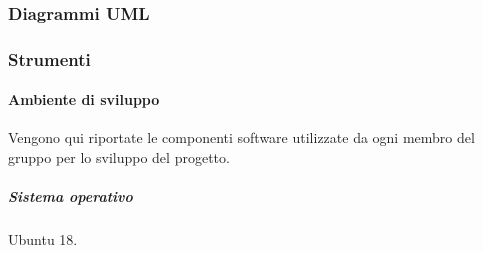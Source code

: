         




		\subsubsection{Diagrammi UML}\label{PP:Sviluppo:UML}	
		
		

        
        \subsubsection{Strumenti}\label{PP:Sviluppo:Strumenti}
        
	    \paragraph{Ambiente di sviluppo}\label{PP:Sviluppo:Strumenti:AmbienteSviluppo}
	    Vengono qui riportate le componenti software utilizzate da ogni membro del gruppo per lo sviluppo del progetto.
	         	
	        	
	    \subparagraph{Sistema operativo}\label{PP:Sviluppo:Strumenti:AmbienteSviluppo:SistemaOperativo}
	    
	    Ubuntu 18.
	        		
        
		
		
	
